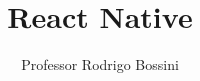 \documentclass[a4paper,12pt,oneside]{book}
\begin{document}
\author{Professor Rodrigo Bossini}
\title{React Native}
\date{}

\maketitle
\frontmatter
\tableofcontents
\mainmatter



\backmatter
\end{document}
